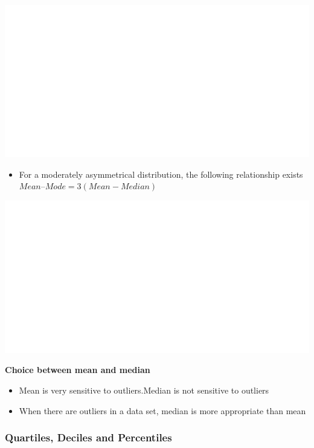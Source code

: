 \documentclass[]{book}
\providecommand{\tightlist}{%
  \setlength{\itemsep}{0pt}\setlength{\parskip}{0pt}}
\begin{document}
\begin{center}\includegraphics[width=1\linewidth]{figure/box24 -1} \end{center}

\begin{itemize}
\tightlist
\item
  For a moderately asymmetrical distribution, the following relationship exists \(Mean – Mode = 3(Mean - Median)\)
\end{itemize}

\begin{center}\includegraphics[width=1\linewidth]{figure/box25 -1} \end{center}

\textbf{Choice between mean and median}

\begin{itemize}
\tightlist
\item
  Mean is very sensitive to outliers.Median is not sensitive to outliers
\item
  When there are outliers in a data set, median is more appropriate than mean
\end{itemize}

\hypertarget{quartiles-deciles-and-percentiles}{%
\subsubsection{Quartiles, Deciles and Percentiles}\label{quartiles-deciles-and-percentiles}}
\end{document}
